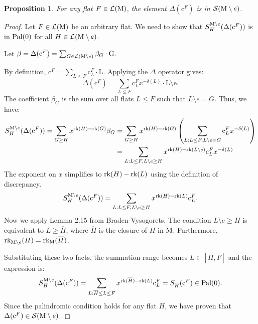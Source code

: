 \documentclass[11pt]{article}
\newcommand{\calL}{\mathcal{L}}
\newcommand{\calS}{\mathcal{S}}
\newcommand{\rank}{\normalfont\text{rk}}
\newcommand{\M}{\normalfont\text{M}}
\newcommand{\Ebasis}[1]{\mathrm{#1}}
\newcommand{\Cbasis}[1]{\mathrm{c}^{#1}}
\newcommand{\CbasisSub}[2]{\mathrm{c}^{#1}_{#2}}
\newcommand{\pal}{\normalfont\text{Pal}}
\newtheorem{proposition}[theorem]{Proposition}
\theoremstyle{remark}
\begin{document}
\begin{proposition}\label{prop:DeltaFInS}
    For any flat \(F \in \mathcal{L}(\M)\), the element \(\Delta(\Cbasis{F})\) is in \(\calS(\M \setminus e)\).
\end{proposition}
\begin{proof}
    Let \(F \in \mathcal{L}(\M)\) be an arbitrary flat. We need to show that
    \(S_H^{\M\setminus e}(\Delta(\Cbasis{F}))\) is in \(\pal(0)\) for all \(H \in \calL(\M \setminus e)\).

    Let \(\beta = \Delta(\Cbasis{F}) = \sum_{G \in \calL(\M \setminus e)} \beta_G \cdot \Ebasis{G}\).

    By definition, \(\Cbasis{F} = \sum_{L \le F} \CbasisSub{F}{L} \cdot \Ebasis{L}\). Applying the \(\Delta\) operator gives:
    \[ \Delta(\Cbasis{F}) = \sum_{L \le F} \CbasisSub{F}{L} x^{-\delta(L)}\cdot \Ebasis{L \setminus e}. \]
    The coefficient \(\beta_G\) is the sum over all flats \(L \le F\) such that \(L \setminus e = G\).
    Thus, we have:
    \begin{align*}
        S_H^{\M\setminus e}(\Delta(\Cbasis{F})) = \sum_{G \ge H} x^{\rank(H)-\rank(G)} \beta_G
         & = \sum_{G \ge H} x^{\rank(H)-\rank(G)} \left( \sum_{L: L \le F, L\setminus e = G} \CbasisSub{F}{L} x^{-\delta(L)} \right) \\
         & = \sum_{L: L \le F, L\setminus e \ge H} x^{\rank(H)-\rank(L \setminus e)} \CbasisSub{F}{L} x^{-\delta(L)}
    \end{align*}
    The exponent on \(x\) simplifies  to \( \rank(H) - \rank(L) \) using the definition of discrepancy.
    \[ S_H^{\M\setminus e}(\Delta(\Cbasis{F})) = \sum_{L: L \le F, L\setminus e \ge H} x^{\rank(H)-\rank(L)}
        \CbasisSub{F}{L}. \]
    Now we apply Lemma 2.15 from Braden-Vysogorets.
    The condition \(L\setminus e \ge H\) is equivalent to \(L \ge \overline{H}\), where \(\overline{H}\)
    is the closure of \(H\) in \(\M\). Furthermore, \(\rank_{\M\setminus e}(H) = \rank_{\M}(\overline{H})\).

    Substituting these two facts, the summation range becomes \(L \in [\overline{H}, F]\) and the expression is:
    \[ S_H^{\M\setminus e}(\Delta(\Cbasis{F})) = \sum_{L: \overline{H} \le L \le F} x^{\rank(\overline{H})-\rank(L)} \CbasisSub{F}{L}
        = S_{\overline{H}}(\Cbasis{F})\in \pal(0). \]
    Since the palindromic condition holds for any flat \(H\), we have proven that
    \(\Delta(\Cbasis{F}) \in \calS(\M \setminus e)\).
\end{proof}
\end{document}
